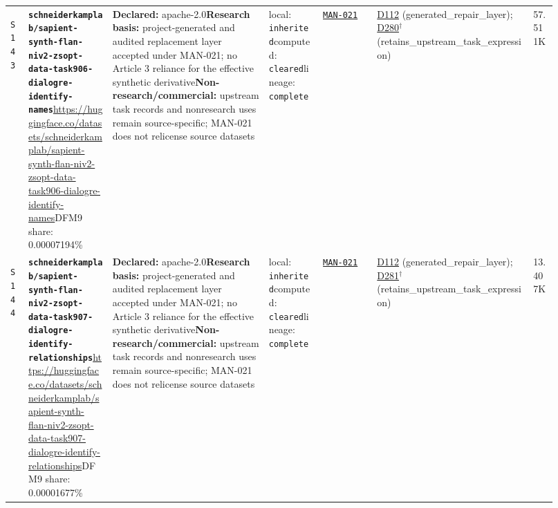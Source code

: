 \documentclass[9pt,a4paper]{article}
\newcommand{\srcid}[1]{\hypertarget{src:#1}{\texttt{#1}}}
\begin{document}
\begin{landscape}
\begin{longtable}{@{}L{0.03\linewidth}L{0.14\linewidth}L{0.26\linewidth}L{0.09\linewidth}L{0.09\linewidth}L{0.265\linewidth}L{0.045\linewidth}@{}}
\srcid{S143} & \textbf{\nolinkurl{schneiderkamplab/sapient-synth-flan-niv2-zsopt-data-task906-dialogre-identify-names}}\newline \url{https://huggingface.co/datasets/schneiderkamplab/sapient-synth-flan-niv2-zsopt-data-task906-dialogre-identify-names}\newline DFM9 share: 0.00007194\% & \textbf{Declared:} apache-2.0\newline \textbf{Research basis:} project-generated and audited replacement layer accepted under MAN-021; no Article 3 reliance for the effective synthetic derivative\newline \textbf{Non-research/commercial:} upstream task records and nonresearch uses remain source-specific; MAN-021 does not relicense source datasets & local: \texttt{inherited}\newline computed: \texttt{cleared}\newline lineage: \texttt{complete} & \hyperlink{manual:MAN-021}{\texttt{MAN-021}} & \hyperlink{dep:D112}{D112} (generated\_repair\_layer); \hyperlink{dep:D280}{D280}$^{\dagger}$ (retains\_upstream\_task\_expression) & 57.511K \\
\srcid{S144} & \textbf{\nolinkurl{schneiderkamplab/sapient-synth-flan-niv2-zsopt-data-task907-dialogre-identify-relationships}}\newline \url{https://huggingface.co/datasets/schneiderkamplab/sapient-synth-flan-niv2-zsopt-data-task907-dialogre-identify-relationships}\newline DFM9 share: 0.00001677\% & \textbf{Declared:} apache-2.0\newline \textbf{Research basis:} project-generated and audited replacement layer accepted under MAN-021; no Article 3 reliance for the effective synthetic derivative\newline \textbf{Non-research/commercial:} upstream task records and nonresearch uses remain source-specific; MAN-021 does not relicense source datasets & local: \texttt{inherited}\newline computed: \texttt{cleared}\newline lineage: \texttt{complete} & \hyperlink{manual:MAN-021}{\texttt{MAN-021}} & \hyperlink{dep:D112}{D112} (generated\_repair\_layer); \hyperlink{dep:D281}{D281}$^{\dagger}$ (retains\_upstream\_task\_expression) & 13.407K \\

\end{longtable}
\end{landscape}
\end{document}
